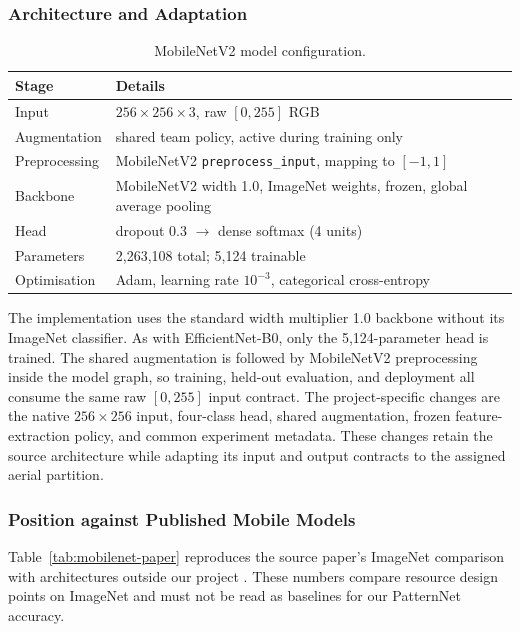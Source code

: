 \documentclass[11pt,twoside,a4paper]{article}
\begin{document}
\subsubsection{Architecture and Adaptation}

\begin{table}[H]
\centering
\caption{MobileNetV2 model configuration.}
\label{tab:mobilenet-config}
\small
\begin{tabular}{ll}
\toprule
Stage & Details \\
\midrule
Input & $256 \times 256 \times 3$, raw $[0,255]$ RGB \\
Augmentation & shared team policy, active during training only \\
Preprocessing & MobileNetV2 \texttt{preprocess\_input}, mapping to $[-1,1]$ \\
Backbone & MobileNetV2 width 1.0, ImageNet weights, frozen, global average pooling \\
Head & dropout 0.3 $\rightarrow$ dense softmax (4 units) \\
Parameters & 2{,}263{,}108 total; 5{,}124 trainable \\
Optimisation & Adam, learning rate $10^{-3}$, categorical cross-entropy \\
\bottomrule
\end{tabular}
\end{table}

The implementation uses the standard width multiplier 1.0 backbone without its
ImageNet classifier. As with EfficientNet-B0, only the 5,124-parameter head is
trained. The shared augmentation is followed by MobileNetV2 preprocessing
inside the model graph, so training, held-out evaluation, and deployment all
consume the same raw $[0,255]$ input contract. The project-specific changes are
the native $256\times256$ input, four-class head, shared augmentation, frozen
feature-extraction policy, and common experiment metadata. These changes retain
the source architecture while adapting its input and output contracts to the
assigned aerial partition.

\subsubsection{Position against Published Mobile Models}

Table~\ref{tab:mobilenet-paper} reproduces the source paper's ImageNet
comparison with architectures outside our project \cite{Sandler2018}. These
numbers compare resource design points on ImageNet and must not be read as
baselines for our PatternNet accuracy.
\end{document}
